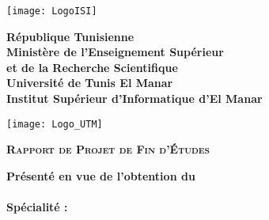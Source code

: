 


\thispagestyle{cover}%
\hspace{-47pt}
\begin{minipage}[l]{0.2\columnwidth}
\vspace{6mm}
\texttt{[image: LogoISI]}\\
\end{minipage}
\hfill
\begin{minipage}[l]{0.6\columnwidth}
\centering
\footnotesize
\textbf{{République Tunisienne}}\\
\vspace{1.5mm}
\textbf{{Ministère de l'Enseignement Supérieur\\
et de la Recherche Scientifique}}\\
\vspace{1.5mm}
\textbf{{Université de Tunis El Manar}}\\
\vspace{1.5mm}
\textbf{{Institut Supérieur d'Informatique d’El Manar}}
\end{minipage}
\hfill
\begin{minipage}[l]{0.02\columnwidth}
\end{minipage}
\hfill
\begin{minipage}[l]{0.18\columnwidth}
\vspace{6mm}
\texttt{[image: Logo\_UTM]}\\
\end{minipage}
\vskip1.5cm

\begin{center}
{\LARGE{\textbf{\textsc{Rapport de Projet de Fin d'\'Etudes}}}}\\
\vskip0.5cm
\large

{\textbf{Présenté en vue de l'obtention du}}\\
\vskip2mm
{\textbf{\@diplomaName}}\\
{\textbf{Spécialité : \@speciality}}\\
{}
\end{center}

